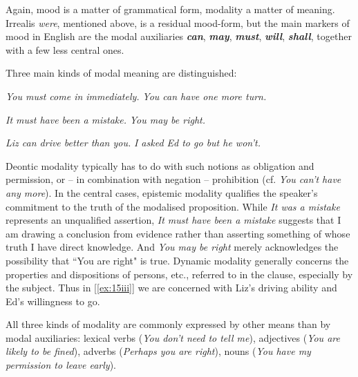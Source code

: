 Again, {mood} is a matter of grammatical form, {modality} a matter of meaning. Irrealis \textit{were}, mentioned above, is a residual mood-form, but the main markers of mood in English are the modal auxiliaries \textbf{\textit{can}}, \textbf{\textit{may}}, \textbf{\textit{must}}, \textbf{\textit{will}}, \textbf{\textit{shall}}, together with a few less central ones. 

Three main kinds of modal meaning are distinguished:
\newlength{\labwidthModal}
\begin{examples}
\item \label{ex:15}
    \begin{examples}
        \item \label{ex:15i} \textit{You must come in immediately.} \quad \textit{You can have one more turn.}
        \item \label{ex:15ii} \textit{It must have been a mistake.} \quad \textit{You may be right.}
        \item\label{ex:15iii}  \textit{Liz can drive better than you.} \quad \textit{I asked Ed to go but he won't.}
    \end{examples}
\end{examples}
Deontic modality typically has to do with such notions as obligation and permission, or -- in combination with negation -- prohibition (cf. \textit{You can't have any more}). In the central cases, epistemic modality qualifies the speaker's commitment to the truth of the modalised proposition. While \textit{It was a mistake} represents an unqualified assertion, \textit{It must have been a mistake} suggests that I am drawing a conclusion from evidence rather than asserting something of whose truth I have direct knowledge. And \textit{You may be right} merely acknowledges the possibility that ``You are right" is true. Dynamic modality generally concerns the properties and dispositions of persons, etc., referred to in the clause, especially by the subject. Thus in [\ref{ex:15iii}] we are concerned with Liz's driving ability and Ed's willingness to go.

All three kinds of modality are commonly expressed by other means than by modal auxiliaries: lexical verbs (\textit{You don't need to tell me}), adjectives (\textit{You are likely to be fined}), adverbs (\textit{Perhaps you are right}), nouns (\textit{You have my permission to leave early}).


